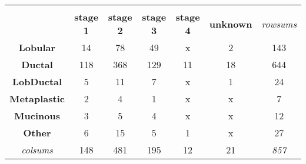\begin{table}[!h]
{\begin{tabular}{ccccccc}
                \multicolumn{1}{l}{} & \multicolumn{1}{l}{} & \multicolumn{1}{l}{} & \multicolumn{1}{l}{} & \multicolumn{1}{l}{} & \multicolumn{1}{l}{} & \multicolumn{1}{l}{} \\
                \multicolumn{1}{c|}{} & \multicolumn{1}{c|}{\textbf{stage 1}} & \multicolumn{1}{c|}{\textbf{stage 2}} & \multicolumn{1}{c|}{\textbf{stage 3}} & \multicolumn{1}{c|}{\textbf{stage 4}} & \multicolumn{1}{c|}{\textbf{unknown}} & {\color[HTML]{9B9B9B} \textit{rowsums}} \\ \hline
                \multicolumn{1}{c|}{\textbf{Lobular}} & \multicolumn{1}{c|}{14} & \multicolumn{1}{c|}{78} & \multicolumn{1}{c|}{49} & \multicolumn{1}{c|}{{\color[HTML]{C0C0C0} x}} & \multicolumn{1}{c|}{2} & \multicolumn{1}{c|}{143} \\ \hline
                \multicolumn{1}{c|}{\textbf{Ductal}} & \multicolumn{1}{c|}{118} & \multicolumn{1}{c|}{368} & \multicolumn{1}{c|}{129} & \multicolumn{1}{c|}{11} & \multicolumn{1}{c|}{18} & \multicolumn{1}{c|}{644} \\ \hline
                \multicolumn{1}{c|}{\textbf{LobDuctal}} & \multicolumn{1}{c|}{5} & \multicolumn{1}{c|}{11} & \multicolumn{1}{c|}{7} & \multicolumn{1}{c|}{{\color[HTML]{C0C0C0} x}} & \multicolumn{1}{c|}{1} & \multicolumn{1}{c|}{24} \\ \hline
                \multicolumn{1}{c|}{\textbf{Metaplastic}} & \multicolumn{1}{c|}{2} & \multicolumn{1}{c|}{4} & \multicolumn{1}{c|}{1} & \multicolumn{1}{c|}{{\color[HTML]{C0C0C0} x}} & \multicolumn{1}{c|}{{\color[HTML]{C0C0C0} x}} & \multicolumn{1}{c|}{7} \\ \hline
                \multicolumn{1}{c|}{\textbf{Mucinous}} & \multicolumn{1}{c|}{3} & \multicolumn{1}{c|}{5} & \multicolumn{1}{c|}{4} & \multicolumn{1}{c|}{{\color[HTML]{C0C0C0} x}} & \multicolumn{1}{c|}{{\color[HTML]{C0C0C0} x}} & \multicolumn{1}{c|}{12} \\ \hline
                \multicolumn{1}{c|}{\textbf{Other}} & \multicolumn{1}{c|}{6} & \multicolumn{1}{c|}{15} & \multicolumn{1}{c|}{5} & \multicolumn{1}{c|}{1} & \multicolumn{1}{c|}{{\color[HTML]{C0C0C0} x}} & \multicolumn{1}{c|}{27} \\ \hline
                \multicolumn{1}{c|}{{\color[HTML]{9B9B9B} \textit{colsums}}} & \multicolumn{1}{c|}{148} & \multicolumn{1}{c|}{481} & \multicolumn{1}{c|}{195} & \multicolumn{1}{c|}{12} & \multicolumn{1}{c|}{21} & \multicolumn{1}{c|}{\textit{857}} \\ \cline{2-7} 
                \end{tabular}%
                }
                \end{table}

